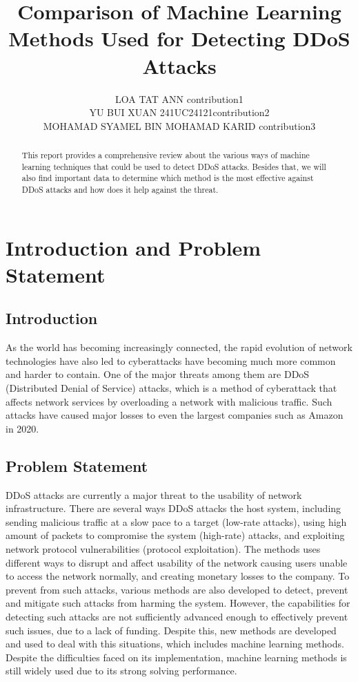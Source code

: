 \documentclass[a4paper, 12pt]{article}
\author{
LOA TAT ANN \quad 1221304731 \quad  contribution1 \\
YU BUI XUAN \quad 241UC24121\quad contribution2\\
MOHAMAD SYAMEL BIN MOHAMAD KARID \quad 1221309130 \quad contribution3\\
}
\title{Comparison of Machine Learning Methods Used for Detecting DDoS Attacks }
\begin{document}
\maketitle

\begin{abstract}
     This report provides a comprehensive review about the various ways of machine learning techniques that could be used to detect DDoS attacks. Besides that, we will also find important data to determine which method is the most effective against DDoS attacks and how does it help against the threat. 
\end{abstract}

\section{Introduction and Problem Statement}

\subsection{Introduction}
As the world has becoming increasingly connected, the rapid evolution of network technologies have also led to cyberattacks have becoming much more common and harder to contain. One of the major threats among them are DDoS (Distributed Denial of Service) attacks, which is a method of cyberattack that affects network services by overloading a network with malicious traffic.\cite{4} Such attacks have caused major losses to even the largest companies such as Amazon in 2020. 

\subsection{Problem Statement}
DDoS attacks are currently a major threat to the usability of network infrastructure. There are several ways DDoS attacks the host system, including sending malicious traffic at a slow pace to a target (low-rate attacks), using high amount of packets to compromise the system (high-rate) attacks, and exploiting network protocol vulnerabilities (protocol exploitation). \cite{1} The methods uses different ways to disrupt and affect usability of the network causing users unable to access the network normally, and creating monetary losses to the company. To prevent from such attacks, various methods are also developed to detect, prevent and mitigate such attacks from harming the system. However, the capabilities for detecting such attacks are not sufficiently advanced enough to effectively prevent such issues, due to a lack of funding. \cite{1} Despite this, new methods are developed and used to deal with this situations, which includes machine learning methods. Despite the difficulties faced on its implementation, machine learning methods is still widely used due to its strong solving performance. \cite{7}
\end{document}
